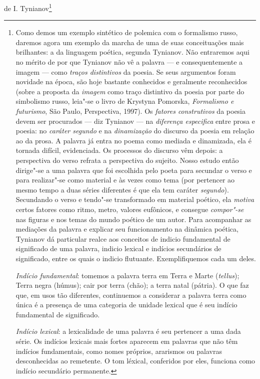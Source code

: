 de I. Tynianov\footnote{Como demos um exemplo sintético de polemica com
  o formalismo russo, daremos agora um exemplo da marcha de uma de suas
  conceituações mais brilhantes: a da linguagem poética, segunda
  Tynianov. Não entraremos aqui no mérito de por que Tynianov não vê a
  palavra --- e consequentemente a imagem --- como \emph{traços
  distintivos} da poesia. Se seus argumentos foram novidade na época,
  são hoje bastante conhecidos e geralmente reconhecidos (sobre a
  proposta da \emph{imagem} como traço distintivo da poesia por parte do
  simbolismo russo, leia"-se o livro de Krystyna Pomorska,
  \emph{Formalismo e futurismo}, São Paulo, Perspectiva, 1997). Os
  \emph{fatores construtivos} da poesia devem ser procurados --- diz
  Tynianov --- na \emph{diferença especifica} entre prosa e poesia: no
  \emph{caráter segundo} e na \emph{dinamização} do discurso da poesia
  em relação ao da prosa. A palavra já entra no poema como mediada e
  dinamizada, ela é tornada difícil, evidenciada. Os processos do
  discurso vêm depois: a perspectiva do verso refrata a perspectiva do
  sujeito. Nosso estudo então dirige"-se a uma palavra que foi escolhida
  pelo poeta para secundar o verso e para realizar"-se como material e às
  vezes como tema (por pertencer ao mesmo tempo a duas séries diferentes
  é que ela tem caráter \emph{segundo}). Secundando o verso e tendo"-se
  transformado em material poético, ela \emph{motiva} certos fatores
  como ritmo, metro, valores eufônicos, e consegue \emph{compor"-se} nas
  figuras e nos temas do mundo poético de um autor. Para acompanhar as
  mediações da palavra e explicar seu funcionamento na dinâmica poética,
  Tynianov dá particular realce aos conceitos de indicio fundamental de
  significado de uma palavra, indicio lexical e indícios secundários de
  significado, entre os quais o indicio flutuante. Exemplifiquemos cada
  um deles.

  \emph{Indício fundamental}: tomemos a palavra terra em Terra e Marte
  (\emph{tellus}); Terra negra (húmus); cair por terra (chão); a terra
  natal (pátria). O que faz que, em usos tão diferentes, continuemos a
  considerar a palavra terra como única é a presença de uma categoria de
  unidade lexical que é seu indício fundamental de significado.

  \emph{Indício lexical}: a lexicalidade de uma palavra é seu pertencer
  a uma dada série. Os indícios lexicais mais fortes aparecem em
  palavras que não têm indícios fundamentais, como nomes próprios,
  ararismos ou palavras desconhecidas ao remetente. O tom léxical,
  conferidos por eles, funciona como indício secundário permanente.

}
